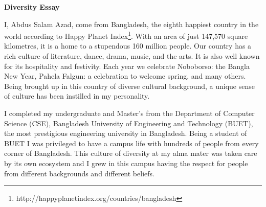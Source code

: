 \documentclass[11.5pt]{article}
\begin{document}


\fancyhf{}
\rfoot{\thepage}

\begin{center}
{\LARGE \bf 
Diversity Essay}\\
\end{center}




I, Abdus Salam Azad, come from Bangladesh, the eighth happiest country in the world according to Happy Planet Index\footnote{http://happyplanetindex.org/countries/bangladesh}. With an area of just 147,570 square kilometres, it is a home to a stupendous 160 million people. Our country has a rich culture of literature, dance, drama, music, and the arts. It is also well known for its hospitality and festivity. Each year we celebrate Noboborso: the Bangla New Year, Pahela Falgun: a celebration to welcome spring, and many others. Being brought up in this country of diverse cultural background, a unique sense of culture has been instilled in my personality.

I completed my undergraduate and Master's from the Department of Computer Science (CSE), Bangladesh University of Engineering and Technology (BUET), the most prestigious engineering university in Bangladesh. Being a student of BUET I was privileged to have a campus life with hundreds of people from every corner of Bangladesh. This culture of diversity at my alma mater was taken care by its own ecosystem and I grew in this campus having the respect for people from different backgrounds and different beliefs. 
\end{document}
